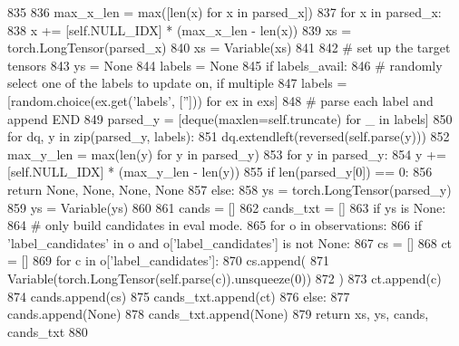 \begin{DoxyCode}
835 
836         max\_x\_len = max([len(x) \textcolor{keywordflow}{for} x \textcolor{keywordflow}{in} parsed\_x])
837         \textcolor{keywordflow}{for} x \textcolor{keywordflow}{in} parsed\_x:
838             x += [self.NULL\_IDX] * (max\_x\_len - len(x))
839         xs = torch.LongTensor(parsed\_x)
840         xs = Variable(xs)
841 
842         \textcolor{comment}{# set up the target tensors}
843         ys = \textcolor{keywordtype}{None}
844         labels = \textcolor{keywordtype}{None}
845         \textcolor{keywordflow}{if} labels\_avail:
846             \textcolor{comment}{# randomly select one of the labels to update on, if multiple}
847             labels = [random.choice(ex.get(\textcolor{stringliteral}{'labels'}, [\textcolor{stringliteral}{''}])) \textcolor{keywordflow}{for} ex \textcolor{keywordflow}{in} exs]
848             \textcolor{comment}{# parse each label and append END}
849             parsed\_y = [deque(maxlen=self.truncate) \textcolor{keywordflow}{for} \_ \textcolor{keywordflow}{in} labels]
850             \textcolor{keywordflow}{for} dq, y \textcolor{keywordflow}{in} zip(parsed\_y, labels):
851                 dq.extendleft(reversed(self.parse(y)))
852             max\_y\_len = max(len(y) \textcolor{keywordflow}{for} y \textcolor{keywordflow}{in} parsed\_y)
853             \textcolor{keywordflow}{for} y \textcolor{keywordflow}{in} parsed\_y:
854                 y += [self.NULL\_IDX] * (max\_y\_len - len(y))
855             \textcolor{keywordflow}{if} len(parsed\_y[0]) == 0:
856                 \textcolor{keywordflow}{return} \textcolor{keywordtype}{None}, \textcolor{keywordtype}{None}, \textcolor{keywordtype}{None}, \textcolor{keywordtype}{None}
857             \textcolor{keywordflow}{else}:
858                 ys = torch.LongTensor(parsed\_y)
859                 ys = Variable(ys)
860 
861         cands = []
862         cands\_txt = []
863         \textcolor{keywordflow}{if} ys \textcolor{keywordflow}{is} \textcolor{keywordtype}{None}:
864             \textcolor{comment}{# only build candidates in eval mode.}
865             \textcolor{keywordflow}{for} o \textcolor{keywordflow}{in} observations:
866                 \textcolor{keywordflow}{if} \textcolor{stringliteral}{'label\_candidates'} \textcolor{keywordflow}{in} o \textcolor{keywordflow}{and} o[\textcolor{stringliteral}{'label\_candidates'}] \textcolor{keywordflow}{is} \textcolor{keywordflow}{not} \textcolor{keywordtype}{None}:
867                     cs = []
868                     ct = []
869                     \textcolor{keywordflow}{for} c \textcolor{keywordflow}{in} o[\textcolor{stringliteral}{'label\_candidates'}]:
870                         cs.append(
871                             Variable(torch.LongTensor(self.parse(c)).unsqueeze(0))
872                         )
873                         ct.append(c)
874                     cands.append(cs)
875                     cands\_txt.append(ct)
876                 \textcolor{keywordflow}{else}:
877                     cands.append(\textcolor{keywordtype}{None})
878                     cands\_txt.append(\textcolor{keywordtype}{None})
879         \textcolor{keywordflow}{return} xs, ys, cands, cands\_txt
880 
\end{DoxyCode}
